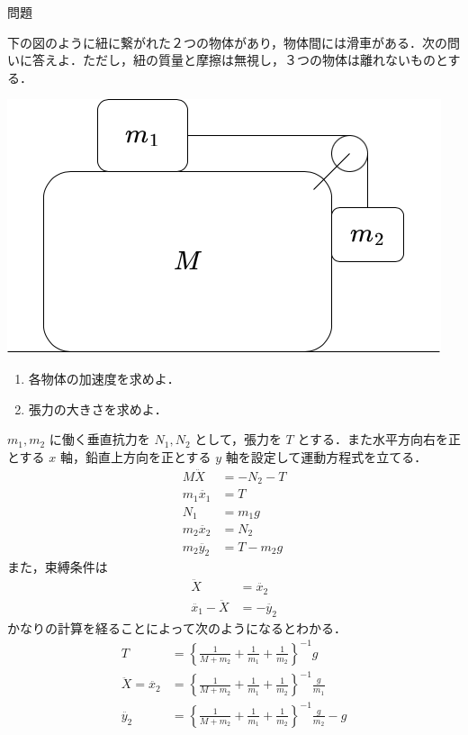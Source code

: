 \documentclass[
  b4paperpaper,
  xelatex,ja=standard]{bxjsbook}
\providecommand{\tightlist}{%
  \setlength{\itemsep}{0pt}\setlength{\parskip}{0pt}}\usepackage{longtable,booktabs,array}
\begin{document}
\begin{Qbox}{問題}

下の図のように紐に繋がれた２つの物体があり，物体間には滑車がある．次の問いに答えよ．ただし，紐の質量と摩擦は無視し，３つの物体は離れないものとする．

\includegraphics{source/images/newton/newton11.png}

\begin{enumerate}
\def\labelenumi{\arabic{enumi}.}
\tightlist
\item
  各物体の加速度を求めよ．
\item
  張力の大きさを求めよ．
\end{enumerate}

\end{Qbox}


\(m_1,m_2\) に働く垂直抗力を \(N_1,N_2\) として，張力を \(T\)
とする．また水平方向右を正とする \(x\) 軸，鉛直上方向を正とする \(y\)
軸を設定して運動方程式を立てる． \begin{align*}
M\ddot{X}&=-N_2-T\\
m_1\ddot{x_1} &= T \\
N_1&=m_1g\\
m_2\ddot{x_2} &= N_2\\
m_2\ddot{y_2} &=T-m_2g
\end{align*} また，束縛条件は \begin{align*}
\ddot{X}&=\ddot{x_2}\\
\ddot{x_1}-\ddot{X}&=-\ddot{y_2}
\end{align*} かなりの計算を経ることによって次のようになるとわかる．
\begin{align*}
T&=\left\{\frac{1}{M+m_2}+\frac{1}{m_1}+\frac{1}{m_2}\right\}^{-1}g\\
\ddot{X}=\ddot{x_2}&=\left\{\frac{1}{M+m_2}+\frac{1}{m_1}+\frac{1}{m_2}\right\}^{-1}\frac{g}{m_1}\\
\ddot{y_2}&=\left\{\frac{1}{M+m_2}+\frac{1}{m_1}+\frac{1}{m_2}\right\}^{-1}\frac{g}{m_2}-g
\end{align*}
\end{document}
